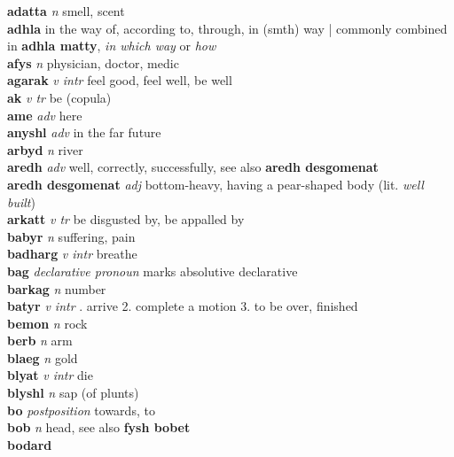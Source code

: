 \textbf{adatta}   \emph{n} \textperiodcentered smell, scent\\\textbf{adhla}    \textperiodcentered in the way of, according to, through, in (smth) way | commonly combined in \textbf{adhla matty}, \emph{in which way} or \emph{how}\\\textbf{afys}   \emph{n} \textperiodcentered physician, doctor, medic\\\textbf{agarak}   \emph{v intr} \textperiodcentered feel good, feel well, be well\\\textbf{ak}   \emph{v tr} \textperiodcentered be (copula)\\\textbf{ame}   \emph{adv} \textperiodcentered here\\\textbf{anyshl}   \emph{adv} \textperiodcentered in the far future\\\textbf{arbyd}   \emph{n} \textperiodcentered river\\\textbf{aredh}   \emph{adv} \textperiodcentered well, correctly, successfully, see also \textbf{aredh desgomenat}\\\textbf{aredh desgomenat}   \emph{adj} \textperiodcentered bottom-heavy, having a pear-shaped body (lit. \emph{well built})\\\textbf{arkatt}   \emph{v tr} \textperiodcentered be disgusted by, be appalled by\\\textbf{babyr}   \emph{n} \textperiodcentered suffering, pain\\\textbf{badharg}   \emph{v intr} \textperiodcentered breathe\\\textbf{bag}   \emph{declarative pronoun} \textperiodcentered marks absolutive declarative\\\textbf{barkag}   \emph{n} \textperiodcentered number\\\textbf{batyr}   \emph{v intr} . arrive 2. complete a motion 3. to be over, finished \\\textbf{bemon}   \emph{n} \textperiodcentered rock\\\textbf{berb}   \emph{n} \textperiodcentered arm\\\textbf{blaeg}   \emph{n} \textperiodcentered gold\\\textbf{blyat}   \emph{v intr} \textperiodcentered die\\\textbf{blyshl}   \emph{n} \textperiodcentered sap (of plunts)\\\textbf{bo}   \emph{postposition} \textperiodcentered towards, to\\\textbf{bob}   \emph{n} \textperiodcentered head, see also \textbf{fysh bobet}\\\textbf{bodard} 
